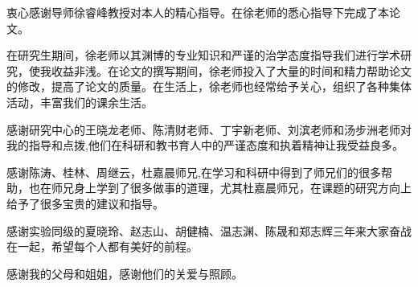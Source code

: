 

衷心感谢导师徐睿峰教授对本人的精心指导。在徐老师的悉心指导下完成了本论文。

在研究生期间，徐老师以其渊博的专业知识和严谨的治学态度指导我们进行学术研究，使我收益非浅。在论文的撰写期间，徐老师投入了大量的时间和精力帮助论文的修改，提高了论文的质量。在生活上，徐老师也经常给予关心，组织了各种集体活动，丰富我们的课余生活。

感谢研究中心的王晓龙老师、陈清财老师、丁宇新老师、刘滨老师和汤步洲老师对我的指导和点拨,他们在科研和教书育人中的严谨态度和执着精神让我受益良多。

感谢陈涛、桂林、周继云，杜嘉晨师兄,在学习和科研中得到了师兄们的很多帮助，也在师兄身上学到了很多做事的道理，尤其杜嘉晨师兄，在课题的研究方向上给予了很多宝贵的建议和指导。

感谢实验同级的夏晓玲、赵志山、胡健楠、温志渊、陈晟和郑志辉三年来大家奋战在一起，希望每个人都有美好的前程。

感谢我的父母和姐姐，感谢他们的关爱与照顾。

